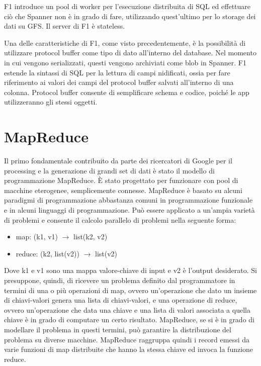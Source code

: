 F1 introduce un pool di worker per l'esecuzione distribuita di SQL ed effettuare ciò che Spanner non è in grado di fare, utilizzando quest'ultimo per lo storage dei dati su GFS. Il server di F1 è stateless. 

Una delle caratteristiche di F1, come visto precedentemente, è la possibilità di utilizzare protocol buffer come tipo di dato all'interno del database. Nel momento in cui vengono serializzati, questi vengono archiviati come blob in Spanner. F1 estende la sintassi di SQL per la lettura di campi nidificati, ossia per fare riferimento ai valori dei campi del protocol buffer salvati all'interno di una colonna. Protocol buffer consente di semplificare schema e codice, poiché le app utilizzeranno gli stessi oggetti.

\section{MapReduce}

Il primo fondamentale contribuito da parte dei ricercatori di Google per il processing e la generazione di grandi set di dati è stato il modello di programmazione MapReduce. È stato progettato per funzionare con pool di macchine eterogenee, semplicemente connesse. MapReduce è basato su alcuni paradigmi di programmazione abbastanza comuni in programmazione funzionale e in alcuni linguaggi di programmazione. Può essere applicato a un'ampia varietà di problemi e consente il calcolo parallelo di problemi nella seguente forma: 

\begin{itemize}
    \item map: (k1, v1) $\rightarrow$ list(k2, v2)
    \item reduce: (k2, list(v2)) $\rightarrow$ list(v2)
\end{itemize}

Dove k1 e v1 sono una mappa valore-chiave di input e v2 è l'output desiderato. Si presuppone, quindi, di ricevere un problema definito dal programmatore in termini di una o più operazioni di map, ovvero un'operazione che dato un insieme di chiavi-valori genera una lista di chiavi-valori, e una operazione di reduce, ovvero un'operazione che data una chiave e una lista di valori associata a quella chiave è in grado di computare un certo risultato. MapReduce, se si è in grado di modellare il problema in questi termini, può garantire la distribuzione del problema su diverse macchine. MapReduce raggruppa quindi i record emessi da varie funzioni di map distribuite che hanno la stessa chiave ed invoca la funzione reduce.


